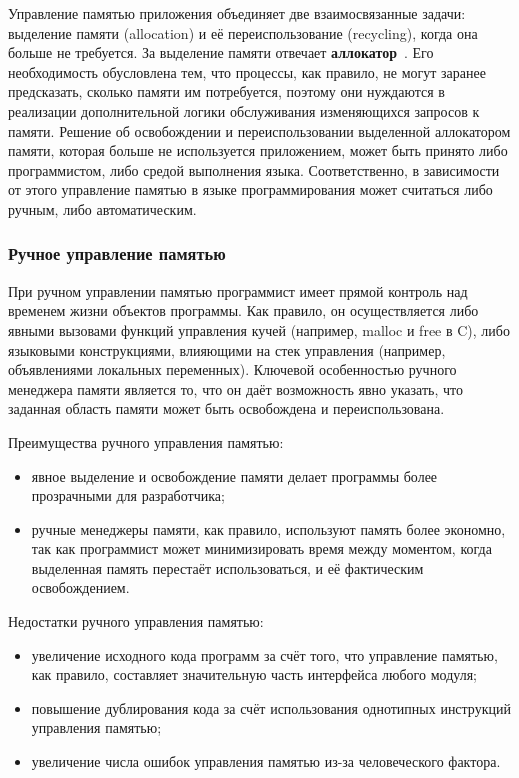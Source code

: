 Управление памятью приложения объединяет две взаимосвязанные задачи: выделение памяти (allocation) и её переиспользование (recycling), когда она больше не требуется. За выделение памяти отвечает \textbf{аллокатор}~\cite{allocator}. Его необходимость обусловлена тем, что процессы, как правило, не могут заранее предсказать, сколько памяти им потребуется, поэтому они нуждаются в реализации дополнительной логики обслуживания изменяющихся запросов к памяти. Решение об освобождении и переиспользовании выделенной аллокатором памяти, которая больше не используется приложением, может быть принято либо программистом, либо средой выполнения языка. Соответственно, в зависимости от этого управление памятью в языке программирования может считаться либо ручным, либо автоматическим.

\subsubsection{Ручное управление памятью}

При ручном управлении памятью программист имеет прямой контроль над временем жизни объектов программы. Как правило, он осуществляется либо явными вызовами функций управления кучей (например, malloc и free в C), либо языковыми конструкциями, влияющими на стек управления (например, объявлениями локальных переменных). Ключевой особенностью ручного менеджера памяти является то, что он даёт возможность явно указать, что заданная область памяти может быть освобождена и переиспользована.~\cite{mm_overview}

Преимущества ручного управления памятью: 

\begin{itemize}[label*=---]
	\item явное выделение и освобождение памяти делает программы более прозрачными для разработчика;
	\item ручные менеджеры памяти, как правило, используют память более экономно, так как программист может минимизировать время между моментом, когда выделенная память перестаёт использоваться, и её фактическим освобождением.
\end{itemize}

Недостатки ручного управления памятью: 

\begin{itemize}[label*=---]
	\item увеличение исходного кода программ за счёт того, что управление памятью, как правило, составляет значительную часть интерфейса любого модуля;
	\item повышение дублирования кода за счёт использования однотипных инструкций управления памятью;
	\item увеличение числа ошибок управления памятью из-за человеческого фактора.
\end{itemize}

